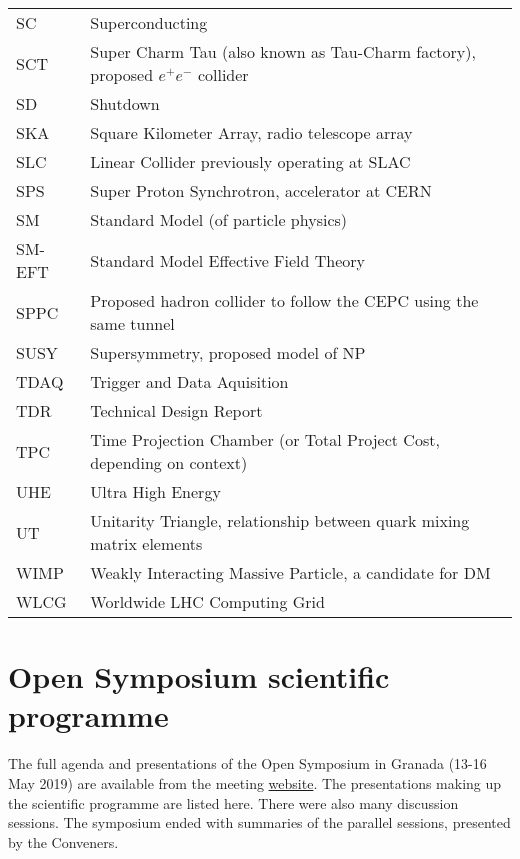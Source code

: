 \begin{tabular}{ll}
SC      &   Superconducting \\
SCT		& 	Super Charm Tau (also known as Tau-Charm factory), proposed $e^+e^-$ collider \\
SD      &   Shutdown \\
SKA     &   Square Kilometer Array, radio telescope array \\
SLC     &   Linear Collider previously operating at SLAC \\
SPS     &   Super Proton Synchrotron, accelerator at CERN \\
SM		& 	Standard Model (of particle physics) \\
SM-EFT	&	Standard Model Effective Field Theory \\
SPPC    &   Proposed hadron collider to follow the CEPC using the same tunnel \\
SUSY    &   Supersymmetry, proposed model of NP \\
TDAQ    &   Trigger and Data Aquisition \\
TDR     &   Technical Design Report \\
TPC     &   Time Projection Chamber (or Total Project Cost, depending on context) \\
UHE     &   Ultra High Energy \\
UT		&	Unitarity Triangle, relationship between quark mixing matrix elements \\
WIMP    &   Weakly Interacting Massive Particle, a candidate for DM \\
WLCG    &   Worldwide LHC Computing Grid \\
\end{tabular}

\section{Open Symposium scientific programme}
The full agenda and presentations of the Open Symposium in Granada (13-16 May 2019) are available from the meeting  \href{https://cafpe.ugr.es/eppsu2019/}{website}. The presentations making up the scientific programme are listed here. There were also many discussion sessions. The symposium ended with summaries of the parallel sessions, presented by the Conveners.
\vspace*{3mm}


